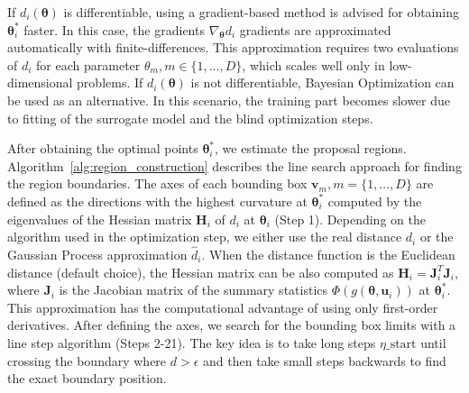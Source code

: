 \documentclass[article]{jss}
\newcommand{\vb}{\mathbf{v}}
\newcommand{\ub}{\mathbf{u}}
\newcommand{\jac}{\mathbf{J}}
\newcommand{\hessian}{\mathbf{H}}
\newcommand{\thetab}{\boldsymbol{\theta}}
\begin{document}
If \(d_i(\thetab)\) is differentiable, using a gradient-based method
is advised for obtaining \(\thetab_i^*\) faster. In this case, the
gradients \(\nabla_{\thetab} d_i\) gradients are approximated
automatically with finite-differences. This approximation requires two
evaluations of \(d_i\) for each parameter
\(\theta_m, m \in \{1, \ldots, D\}\), which scales well only in
low-dimensional problems. If \(d_i(\thetab)\) is not differentiable,
Bayesian Optimization can be used as an alternative. In this scenario,
the training part becomes slower due to fitting of the surrogate model
and the blind optimization steps.

After obtaining the optimal points \(\thetab^*_i\), we estimate the
proposal regions. Algorithm~\ref{alg:region_construction} describes
the line search approach for finding the region boundaries. The axes
of each bounding box \(\vb_m, m = \{1, \ldots, D\}\) are defined as
the directions with the highest curvature at \(\thetab_i^*\) computed
by the eigenvalues of the Hessian matrix \(\hessian_i\) of \(d_i\) at
\(\thetab_i\) (Step 1). Depending on the algorithm used in the
optimization step, we either use the real distance \(d_i\) or the
Gaussian Process approximation \(\hat{d}_i\). When the distance
function is the Euclidean distance (default choice), the Hessian
matrix can be also computed as \(\hessian_i = \jac_i^T\jac_i\), where
\(\jac_i\) is the Jacobian matrix of the summary statistics
\(\Phi(g(\thetab, \ub_i))\) at \(\thetab_i^*\). This approximation has
the computational advantage of using only first-order
derivatives. After defining the axes, we search for the bounding box
limits with a line step algorithm (Steps 2-21). The key idea is to
take long steps \(\eta\_\text{start}\) until crossing the boundary
where \(d > \epsilon\) and then take small steps backwards to find the
exact boundary position.
\end{document}
